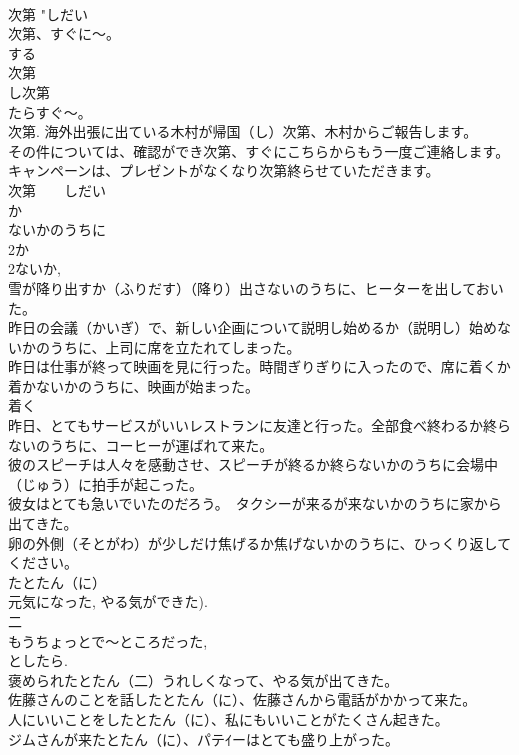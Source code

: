 \documentclass[8pt]{extreport}
\begin{document}
\begin{CJK}{UTF8}{min}
\\	次第	"しだい 
\\	次第、すぐに～。 
\\	する 
\\	次第 
\\	し次第 
\\	たらすぐ～。 
\\	次第. 海外出張に出ている木村が帰国（し）次第、木村からご報告します。 
\\	その件については、確認ができ次第、すぐにこちらからもう一度ご連絡します。 
\\	キャンペーンは、プレゼントがなくなり次第終らせていただきます。 
\\	次第　　しだい 
\\	か
\\	ないかのうちに 
\\	2か
\\	2ないか, 
\\	雪が降り出すか（ふりだす）（降り）出さないのうちに、ヒーターを出しておいた。 
\\	昨日の会議（かいぎ）で、新しい企画について説明し始めるか（説明し）始めないかのうちに、上司に席を立たれてしまった。 
\\	昨日は仕事が終って映画を見に行った。時間ぎりぎりに入ったので、席に着くか着かないかのうちに、映画が始まった。 
\\	着く 
\\	昨日、とてもサービスがいいレストランに友達と行った。全部食べ終わるか終らないのうちに、コーヒーが運ばれて来た。 
\\	彼のスピーチは人々を感動させ、スピーチが終るか終らないかのうちに会場中（じゅう）に拍手が起こった。 
\\	彼女はとても急いでいたのだろう。　タクシーが来るが来ないかのうちに家から出てきた。 
\\	卵の外側（そとがわ）が少しだけ焦げるか焦げないかのうちに、ひっくり返してください。 
\\	たとたん（に） 
\\	元気になった, やる気ができた). 
\\	二 
\\	もうちょっとで～ところだった, 
\\	としたら. 
\\	褒められたとたん（二）うれしくなって、やる気が出てきた。 
\\	佐藤さんのことを話したとたん（に）、佐藤さんから電話がかかって来た。 
\\	人にいいことをしたとたん（に）、私にもいいことがたくさん起きた。 
\\	ジムさんが来たとたん（に）、パテｲーはとても盛り上がった。 

\end{CJK}
\end{document}
